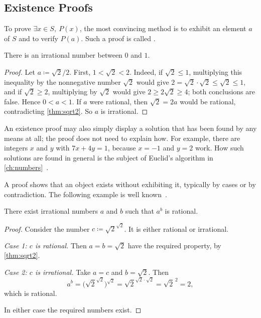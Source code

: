 \subsection{Existence Proofs}

To prove $\exists x\in S,\ P(x)$, the most convincing method is to exhibit an element $a$ of $S$ and to verify $P(a)$. Such a proof is called .

\begin{proposition}
\label{prop:irrational-between}
There is an irrational number between $0$ and $1$.
\end{proposition}

\begin{proof}
Let $a\coloneqq\sqrt2/2$. First, $1<\sqrt2<2$. Indeed, if $\sqrt2\le1$, multiplying this inequality by the nonnegative number $\sqrt2$ would give $2=\sqrt2\cdot\sqrt2\le\sqrt2\le1$, and if $\sqrt2\ge2$, multiplying by $\sqrt2$ would give $2\ge2\sqrt2\ge4$; both conclusions are false. Hence $0<a<1$. If $a$ were rational, then $\sqrt2=2a$ would be rational, contradicting \cref{thm:sqrt2}. So $a$ is irrational.
\end{proof}

An existence proof may also simply display a solution that has been found by any means at all; the proof does not need to explain how. For example, there are integers $x$ and $y$ with $7x+4y=1$, because $x=-1$ and $y=2$ work. How such solutions are found in general is the subject of Euclid's algorithm in \cref{ch:numbers}~\cite{hardywright2008}.

A  proof shows that an object exists without exhibiting it, typically by cases or by contradiction. The following example is well known~\cite{jarden1953}.

\begin{theorem}
\label{thm:irrational-power}
There exist irrational numbers $a$ and $b$ such that $a^b$ is rational.
\end{theorem}

\begin{proof}
Consider the number $c\coloneqq\sqrt2^{\sqrt2}$. It is either rational or irrational.

\emph{Case 1: $c$ is rational.} Then $a=b=\sqrt2$ have the required property, by \cref{thm:sqrt2}.

\emph{Case 2: $c$ is irrational.} Take $a=c$ and $b=\sqrt2$. Then
\[
a^b=\bigl(\sqrt2^{\sqrt2}\bigr)^{\sqrt2}=\sqrt2^{\sqrt2\cdot\sqrt2}=\sqrt2^{\,2}=2,
\]
which is rational.

In either case the required numbers exist.
\end{proof}

